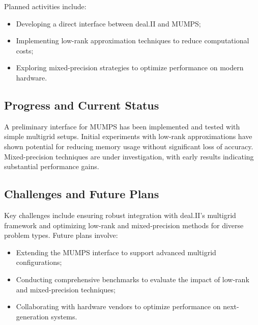 \documentclass[a4paper,12pt]{article}
\begin{document}
    Planned activities include:
    \begin{itemize}
        \item Developing a direct interface between deal.II and MUMPS;
        \item Implementing low-rank approximation techniques to reduce computational costs;
        \item Exploring mixed-precision strategies to optimize performance on modern hardware.
    \end{itemize}

    \subsection{Progress and Current Status}
    A preliminary interface for MUMPS has been implemented and tested with simple multigrid setups. Initial experiments with low-rank approximations have shown potential for reducing memory usage without significant loss of accuracy. Mixed-precision techniques are under investigation, with early results indicating substantial performance gains.

    \subsection{Challenges and Future Plans}
    Key challenges include ensuring robust integration with deal.II's multigrid framework and optimizing low-rank and mixed-precision methods for diverse problem types. Future plans involve:
    \begin{itemize}
        \item Extending the MUMPS interface to support advanced multigrid configurations;
        \item Conducting comprehensive benchmarks to evaluate the impact of low-rank and mixed-precision techniques;
        \item Collaborating with hardware vendors to optimize performance on next-generation systems.
    \end{itemize}



    
\label{MyLastPage}
\end{document}
